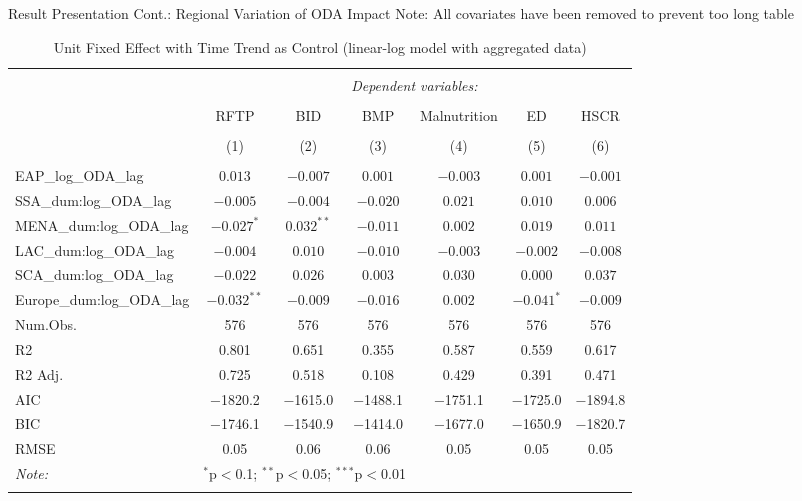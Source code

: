 \documentclass[aspectratio=169,handout, 10pt]{beamer}
\begin{document}
\begin{frame}{Result Presentation Cont.: Regional Variation of ODA Impact}
Note: All covariates have been removed to prevent too long table
\footnotesize
\renewcommand{\arraystretch}{0.6} 
\begin{longtable}{@{\extracolsep{5pt}}lcccccc} 
\caption{Unit Fixed Effect with Time Trend as Control (linear-log model with aggregated data)}
\\[-2ex]
\hline 
\hline \\[-1ex] 
 & \multicolumn{6}{c}{\textit{Dependent variables:}} \\ 
\cline{2-7} 
\\[-1ex] 
 & RFTP & BID  & BMP & Malnutrition & ED  & HSCR \\
\\[-1.8ex] & (1) & (2) & (3) & (4) & (5) & (6)\\ 
\hline \\[-1ex]

EAP\_log\_ODA\_lag             & $0.013$        & $-0.007$       & $0.001$      & $-0.003$       & $0.001$        & $-0.001$      \\
SSA\_dum:log\_ODA\_lag    & $-0.005$       & $-0.004$       & $-0.020$     & $0.021$        & $0.010$        & $0.006$       \\
MENA\_dum:log\_ODA\_lag   & $-0.027^{*}$   & $0.032^{**}$   & $-0.011$     & $0.002$        & $0.019$        & $0.011$       \\
LAC\_dum:log\_ODA\_lag    & $-0.004$       & $0.010$        & $-0.010$     & $-0.003$       & $-0.002$       & $-0.008$      \\
SCA\_dum:log\_ODA\_lag    & $-0.022$       & $0.026$        & $0.003$      & $0.030$        & $0.000$        & $0.037$       \\

Europe\_dum:log\_ODA\_lag & $-0.032^{**}$  & $-0.009$       & $-0.016$     & $0.002$        & $-0.041^{*}$   & $-0.009$      \\

\hline
\midrule
Num.Obs. & \num{576} & \num{576} & \num{576} & \num{576} & \num{576} & \num{576}\\
R2 & \num{0.801} & \num{0.651} & \num{0.355} & \num{0.587} & \num{0.559} & \num{0.617}\\
R2 Adj. & \num{0.725} & \num{0.518} & \num{0.108} & \num{0.429} & \num{0.391} & \num{0.471}\\
AIC & \num{-1820.2} & \num{-1615.0} & \num{-1488.1} & \num{-1751.1} & \num{-1725.0} & \num{-1894.8}\\
BIC & \num{-1746.1} & \num{-1540.9} & \num{-1414.0} & \num{-1677.0} & \num{-1650.9} & \num{-1820.7}\\
RMSE & \num{0.05} & \num{0.06} & \num{0.06} & \num{0.05} & \num{0.05} & \num{0.05}\\

\hline 
\hline
\textit{Note:}  & \multicolumn{3}{r}{$^{*}$p$<$0.1; $^{**}$p$<$0.05; $^{***}$p$<$0.01} \\
\label{table:FE_RQ1}
\end{longtable}
 
\end{frame}
\end{document}
